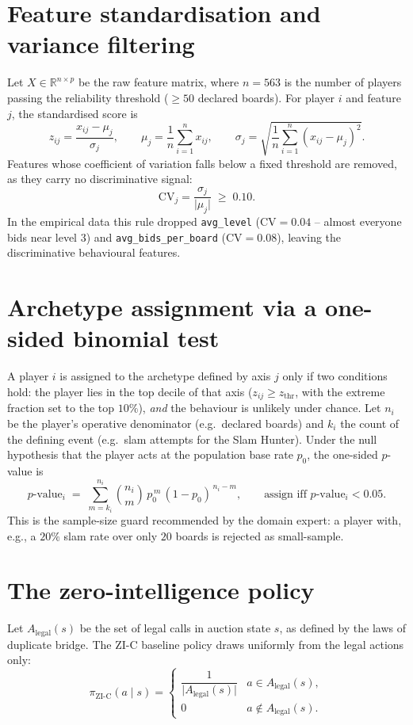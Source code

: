 \documentclass[11pt, a4paper, oneside, openany]{report}
\begin{document}
\section{Feature standardisation and variance filtering}
Let $X \in \mathbb{R}^{n \times p}$ be the raw feature matrix, where
$n = 563$ is the number of players passing the reliability threshold
($\geq 50$ declared boards). For player $i$ and feature $j$, the standardised
score is
\begin{equation}
z_{ij} = \frac{x_{ij} - \mu_j}{\sigma_j},
\qquad
\mu_j = \frac{1}{n}\sum_{i=1}^{n} x_{ij},
\qquad
\sigma_j = \sqrt{\frac{1}{n}\sum_{i=1}^{n}\left(x_{ij}-\mu_j\right)^2}.
\end{equation}
Features whose coefficient of variation falls below a fixed threshold are
removed, as they carry no discriminative signal:
\begin{equation}
\mathrm{CV}_j = \frac{\sigma_j}{\lvert \mu_j \rvert} \;\geq\; 0.10 .
\end{equation}
In the empirical data this rule dropped \texttt{avg\_level}
($\mathrm{CV}=0.04$ -- almost everyone bids near level $3$) and
\texttt{avg\_bids\_per\_board} ($\mathrm{CV}=0.08$), leaving the
discriminative behavioural features.

\section{Archetype assignment via a one-sided binomial test}
A player $i$ is assigned to the archetype defined by axis $j$ only if two
conditions hold: the player lies in the top decile of that axis
($z_{ij} \geq z_{\text{thr}}$, with the extreme fraction set to the top
$10\%$), \emph{and} the behaviour is unlikely under chance. Let $n_i$ be the
player's operative denominator (e.g.\ declared boards) and $k_i$ the count of
the defining event (e.g.\ slam attempts for the Slam Hunter). Under the null
hypothesis that the player acts at the population base rate $p_0$, the
one-sided $p$-value is
\begin{equation}
p\text{-value}_i \;=\; \sum_{m=k_i}^{n_i}\binom{n_i}{m}\,p_0^{\,m}\,(1-p_0)^{\,n_i-m},
\qquad\text{assign iff } p\text{-value}_i < 0.05 .
\end{equation}
This is the sample-size guard recommended by the domain expert: a player with,
e.g., a $20\%$ slam rate over only $20$ boards is rejected as small-sample.

\section{The zero-intelligence policy}
Let $A_{\text{legal}}(s)$ be the set of legal calls in auction state $s$, as
defined by the laws of duplicate bridge. The ZI-C baseline policy draws
uniformly from the legal actions only:
\begin{equation}
\pi_{\text{ZI-C}}(a \mid s) =
\begin{cases}
\dfrac{1}{\lvert A_{\text{legal}}(s)\rvert} & a \in A_{\text{legal}}(s),\\[1.2ex]
0 & a \notin A_{\text{legal}}(s).
\end{cases}
\end{equation}
\end{document}
